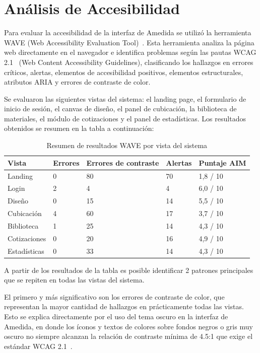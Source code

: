 ﻿\documentclass{iccmemoria}
\begin{document}
\section{Análisis de Accesibilidad}
Para evaluar la accesibilidad de la interfaz de Amedida se utilizó la herramienta WAVE (Web Accessibility Evaluation Tool)~\cite{wave}. Esta herramienta analiza la página web directamente en el navegador e identifica problemas según las pautas WCAG 2.1~\cite{wcag} (Web Content Accessibility Guidelines), clasificando los hallazgos en errores críticos, alertas, elementos de accesibilidad positivos, elementos estructurales, atributos ARIA y errores de contraste de color.

Se evaluaron las siguientes vistas del sistema: el landing page, el formulario de inicio de sesión, el canvas de diseño, el panel de cubicación, la biblioteca de materiales, el módulo de cotizaciones y el panel de estadísticas. Los resultados obtenidos se resumen en la tabla a continuación:

\begin{table}[H]
\centering
\small
\caption{Resumen de resultados WAVE por vista del sistema}
\label{tab:wave_resultados}
\begin{tabular}{|p{2.6cm}|p{1.4cm}|p{2.2cm}|p{1.4cm}|p{2.5cm}|}
\hline
\textbf{Vista} & \textbf{Errores} & \textbf{Errores de contraste} & \textbf{Alertas} & \textbf{Puntaje AIM} \\
\hline
Landing       & 0 & 80 & 70 & 1{,}8 / 10 \\
\hline
Login         & 2 & 4  & 4  & 6{,}0 / 10 \\
\hline
Diseño        & 0 & 15 & 14 & 5{,}5 / 10 \\
\hline
Cubicación    & 4 & 60 & 17 & 3{,}7 / 10 \\
\hline
Biblioteca    & 1 & 25 & 14 & 4{,}3 / 10 \\
\hline
Cotizaciones  & 0 & 20 & 16 & 4{,}9 / 10 \\
\hline
Estadísticas  & 0 & 33 & 14 & 4{,}3 / 10 \\
\hline
\end{tabular}
\end{table}

A partir de los resultados de la tabla es posible identificar 2 patrones principales que se repiten en todas las vistas del sistema.

El primero y más significativo son los errores de contraste de color, que representan la mayor cantidad de hallazgos en prácticamente todas las vistas. Esto se explica directamente por el uso del tema oscuro en la interfaz de Amedida, en donde los íconos y textos de colores sobre fondos negros o gris muy oscuro no siempre alcanzan la relación de contraste mínima de 4.5:1 que exige el estándar WCAG 2.1~\cite{wcag}.\\
\end{document}
